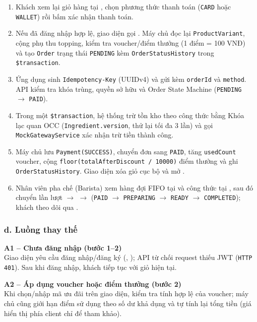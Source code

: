 \documentclass[12pt,a4paper]{report}
\begin{document}
\begin{enumerate}
    \item Khách xem lại giỏ hàng tại , chọn phương thức thanh toán (\texttt{CARD} hoặc \texttt{WALLET}) rồi bấm xác nhận thanh toán.
    \item Nếu đã đăng nhập hợp lệ, giao diện gọi . Máy chủ đọc lại \texttt{ProductVariant}, cộng phụ thu topping, kiểm tra voucher/điểm thưởng (1 điểm = 100 VNĐ) và tạo \texttt{Order} trạng thái \texttt{PENDING} kèm \texttt{OrderStatusHistory} trong \texttt{\$transaction}.
    \item Ứng dụng sinh \texttt{Idempotency-Key} (UUIDv4) và gửi  kèm \texttt{orderId} và \texttt{method}. API kiểm tra khóa trùng, quyền sở hữu và Order State Machine (\texttt{PENDING} $\rightarrow$ \texttt{PAID}).
    \item Trong một \texttt{\$transaction}, hệ thống trừ tồn kho theo công thức bằng Khóa lạc quan OCC (\texttt{Ingredient.version}, thử lại tối đa 3 lần) và gọi \texttt{MockGatewayService} xác nhận trừ tiền thành công.
    \item Máy chủ lưu \texttt{Payment(SUCCESS)}, chuyển đơn sang \texttt{PAID}, tăng \texttt{usedCount} voucher, cộng \texttt{floor(totalAfterDiscount / 10000)} điểm thưởng và ghi \texttt{OrderStatusHistory}. Giao diện xóa giỏ cục bộ và mở .
    \item Nhân viên pha chế (Barista) xem hàng đợi FIFO tại  và công thức tại , sau đó chuyển lần lượt  $\rightarrow$  $\rightarrow$  (\texttt{PAID} $\rightarrow$ \texttt{PREPARING} $\rightarrow$ \texttt{READY} $\rightarrow$ \texttt{COMPLETED}); khách theo dõi qua .
\end{enumerate}

\subsubsection*{d. Luồng thay thế}

\noindent\textbf{A1 -- Chưa đăng nhập (bước 1--2)} \\
Giao diện yêu cầu đăng nhập/đăng ký (, ); API từ chối request thiếu JWT (\texttt{HTTP 401}). Sau khi đăng nhập, khách tiếp tục với giỏ hiện tại.

\medskip
\noindent\textbf{A2 -- Áp dụng voucher hoặc điểm thưởng (bước 2)} \\
Khi chọn/nhập mã ưu đãi trên giao diện,  kiểm tra tính hợp lệ của voucher; máy chủ cũng giới hạn điểm sử dụng theo số dư khả dụng và tự tính lại tổng tiền (giá hiển thị phía client chỉ để tham khảo).
\end{document}
